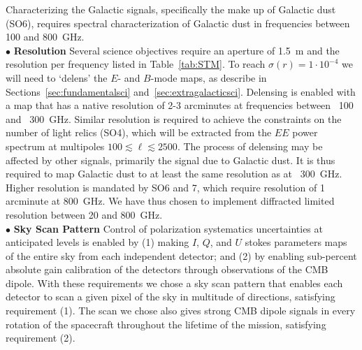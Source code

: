 \documentclass[PICOReport.tex]{subfiles}
\begin{document}
Characterizing the Galactic signals, specifically the make up of Galactic dust (SO6), requires spectral characterization 
of Galactic dust in frequencies between 100 and 800~GHz. \\ 
%
$\bullet$ {\bf Resolution} \hspace{0.1in} 
Several science objectives require an aperture of 1.5~m and the resolution per frequency listed in Table~\ref{tab:STM}. To reach $\sigma(r) = 1\cdot10^{-4}$ we will need to `delens' the $E$- and $B$-mode maps, as describe in Sections~\ref{sec:fundamentalsci} and~\ref{sec:extragalacticsci}. Delensing is enabled with a map that has a native resolution of 2-3 arcminutes at frequencies between ~100 and ~300~GHz. Similar resolution is required to achieve the constraints on the number of light relics (SO4), which will be extracted from the $EE$ power spectrum at multipoles $100 \lesssim \ell \lesssim 2500$.  The process of delensing may be affected by other signals, primarily the signal due to Galactic dust. It is thus required to map Galactic dust to at least the same resolution as at ~300~GHz. Higher resolution is mandated by SO6 and 7, which require resolution of 1 arcminute at 800~GHz.  We have thus chosen to implement diffracted limited resolution between 20 and 800~GHz. \\
%
$\bullet$ {\bf Sky Scan Pattern} \hspace{0.1in} 
Control of polarization systematics uncertainties at anticipated levels is enabled by (1) making $I$, $Q$, and $U$ stokes parameters maps of the entire sky from each independent detector; and (2) by enabling sub-percent absolute gain calibration of the detectors through observations of the CMB dipole.  With these requirements we chose a sky scan pattern that enables each detector to scan a given pixel of the sky in multitude of directions, satisfying requirement (1). The scan we chose also gives strong CMB dipole signals in every rotation of the spacecraft throughout the lifetime of the mission, satisfying requirement (2). 

 
\end{document}
